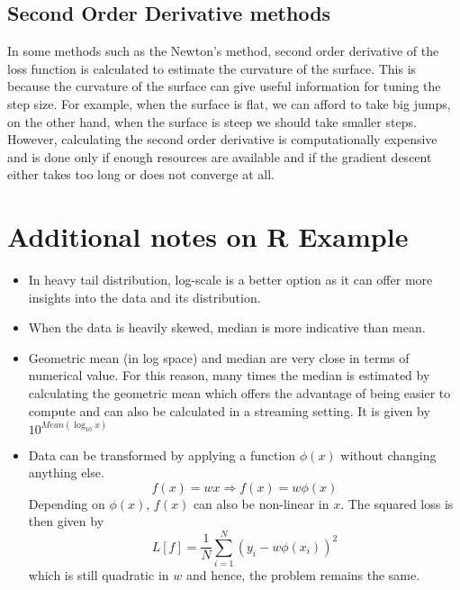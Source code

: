 \subsection{Second Order Derivative methods}
In some methods such as the Newton's method, second order derivative of the loss function is calculated to estimate the curvature of the surface. This is because the curvature of the surface can give useful information for tuning the step size. For example, when the surface is flat, we can afford to take big jumps, on the other hand, when the surface is steep we should take smaller steps. However, calculating the second order derivative is computationally expensive and is done only if enough resources are available and if the gradient descent either takes too long or does not converge at all. 
\section{Additional notes on R Example}
\begin{itemize}
\item In heavy tail distribution, log-scale is a better option as it can offer more insights into the data and its distribution. 
\item When the data is heavily skewed, median is more indicative than mean. 
\item Geometric mean (in log space) and median are very close in terms of numerical value. For this reason, many times the median is estimated by calculating the geometric mean which offers the advantage of being easier to compute and can also be calculated in a streaming setting.  It is given by 
$ 10^{Mean(\log_{10}{x})}$
\item Data can be transformed by applying a function $\phi(x)$ without changing anything else. 
\begin{equation}
f(x)=wx \Rightarrow f(x)=w \phi(x)
\end{equation}
Depending on $\phi(x)$, $f(x)$ can also be non-linear in $x$. The squared loss is then given by 
\begin{equation}
L[f]=\frac{1}{N} \sum_{i=1}^{N}{(y_{i}- w\phi(x_{i}))^{2}}
\end{equation}
which is still quadratic in $w$ and hence, the problem remains the same. 
\end{itemize}